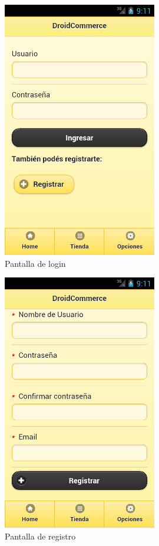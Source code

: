\begin{figure}
  \centering
    \includegraphics[width=0.6\textwidth]{imagenes/capturas/login.png}
        \caption{Pantalla de login}
    \label{fig:login}
\end{figure}

\begin{figure}
  \centering
    \includegraphics[width=0.6\textwidth]{imagenes/capturas/registro2.png}
        \caption{Pantalla de registro}
    \label{fig:login}
\end{figure}

